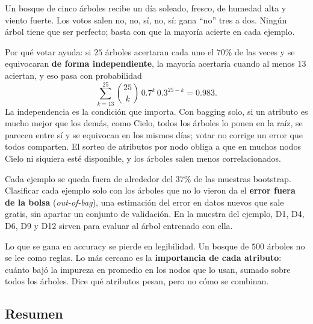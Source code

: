 \documentclass[11pt,letterpaper]{article}
\begin{document}
\begin{ejemplo}[La votación]
    Un bosque de cinco árboles recibe un día soleado, fresco, de
    humedad alta y viento fuerte. Los votos salen no, no, sí, no, sí:
    gana ``no'' tres a dos. Ningún árbol tiene que ser perfecto; basta
    con que la mayoría acierte en cada ejemplo.
\end{ejemplo}

\begin{idea}
    Por qué votar ayuda: si $25$ árboles acertaran cada uno el $70\%$
    de las veces y se equivocaran \textbf{de forma independiente}, la
    mayoría acertaría cuando al menos $13$ aciertan, y eso pasa con
    probabilidad
    \[
        \sum_{k=13}^{25} \binom{25}{k}\, 0.7^k\, 0.3^{25-k} = 0.983 .
    \]
    La independencia es la condición que importa. Con bagging solo, si
    un atributo es mucho mejor que los demás, como Cielo, todos los
    árboles lo ponen en la raíz, se parecen entre sí y se equivocan en
    los mismos días; votar no corrige un error que todos comparten. El
    sorteo de atributos por nodo obliga a que en muchos nodos Cielo ni
    siquiera esté disponible, y los árboles salen menos correlacionados.
\end{idea}

Cada ejemplo se queda fuera de alrededor del $37\%$ de las muestras
bootstrap. Clasificar cada ejemplo solo con los árboles que no lo
vieron da el \textbf{error fuera de la bolsa} (\textit{out-of-bag}),
una estimación del error en datos nuevos que sale gratis, sin apartar
un conjunto de validación. En la muestra del ejemplo, D1, D4, D6, D9 y
D12 sirven para evaluar al árbol entrenado con ella.

\begin{ojo}
    Lo que se gana en accuracy se pierde en legibilidad. Un bosque de
    $500$ árboles no se lee como reglas. Lo más cercano es la
    \textbf{importancia de cada atributo}: cuánto bajó la impureza en
    promedio en los nodos que lo usan, sumado sobre todos los árboles.
    Dice qué atributos pesan, pero no cómo se combinan.
\end{ojo}


\subsection*{Resumen}
\end{document}
